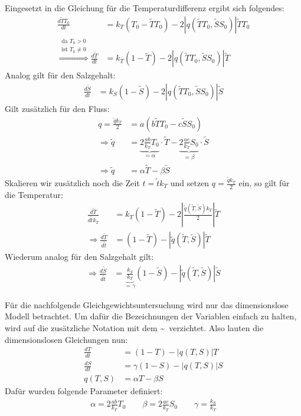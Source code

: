 \documentclass[a4paper,twoside]{article}
\begin{document}
	Eingesetzt in die Gleichung für die Temperaturdifferenz ergibt sich folgendes:
	\begin{align*}
		\frac{d\tilde{T} T_0}{dt} &= k_T\left(T_{0} - \tilde{T} T_0 \right) - 2\left|q(\tilde{T} T_0,\tilde{S} S_0)\right| \tilde{T} T_0 \\
		\stackrel{
			\substack{
				\textrm{da } T_0 > 0\\
				\textrm{ist } T_0 \neq 0
			}
		}{\Rightarrow}
		\frac{d\tilde{T}}{dt} &= k_T\left(1 - \tilde{T}\right) - 2\left|q(\tilde{T} T_0,\tilde{S} S_0)\right| \tilde{T}
	\end{align*}
	Analog gilt für den Salzgehalt:
	\begin{align*}
		\frac{d\tilde{S}}{dt} &= k_S\left(1 - \tilde{S}\right) - 2\left|q(\tilde{T} T_0,\tilde{S} S_0)\right| \tilde{S}
	\end{align*}
	Gilt zusätzlich für den Fluss:
	\begin{align*}
		q = \frac{\tilde{q} k_T}{2} &= a \left( b\tilde{T}T_0 - c\tilde{S}S_0 \right) \\
		\Rightarrow \tilde{q} &= \underbrace{2\frac{ab}{k_T}T_0}_{= \alpha} \cdot \tilde{T} - \underbrace{2\frac{ac}{k_T}S_0}_{=\beta} \cdot \tilde{S} \\
		\Rightarrow \tilde{q} &= \alpha\tilde{T} - \beta\tilde{S}
	\end{align*}
	Skalieren wir zusätzlich noch die Zeit \(t = \tilde{t} k_T\) und setzen \(q = \frac{\tilde{q}k_T}{2}\) ein, so gilt für die Temperatur:
	\begin{align*}
		\frac{d\tilde{T}}{d\tilde{t} k_T} &= k_T\left(1 - \tilde{T}\right) - 2\left|\frac{\tilde{q}(\tilde{T},\tilde{S})k_T}{2}\right| \tilde{T} \\
		\Rightarrow \frac{d\tilde{T}}{d\tilde{t}} &= (1 - \tilde{T}) - \left| \tilde{q}(\tilde{T},\tilde{S})\right|\tilde{T}
	\end{align*}
	Wiederum analog für den Salzgehalt gilt:
	\begin{align*}
		\Rightarrow \frac{d\tilde{S}}{d\tilde{t}} &= \underbrace{\frac{k_S}{k_T}}_{=\gamma}(1 - \tilde{S}) - \left| \tilde{q}(\tilde{T},\tilde{S})\right|\tilde{S}
	\end{align*}
	
	Für die nachfolgende Gleichgewichtsuntersuchung wird nur das dimensionslose Modell betrachtet. Um dafür die Bezeichnungen der Variablen einfach zu halten, wird auf die zusätzliche Notation mit dem \textasciitilde\ verzichtet. Also lauten die dimensionslosen Gleichungen nun:
	\begin{align*}
		\frac{dT}{dt} &= (1 - T) - \left| q(T,S)\right|T \\
		\frac{dS}{dt} &= \gamma (1 - S) - \left| q(T,S)\right|S \\
		q(T,S) &= \alpha T - \beta S
	\end{align*}
	Dafür wurden folgende Parameter definiert:
	\begin{align*}
		\alpha = 2\frac{ab}{k_T}T_0 \qquad
		\beta = 2\frac{ac}{k_T}S_0 \qquad
		\gamma = \frac{k_S}{k_T}
	\end{align*}
	
\end{document}
